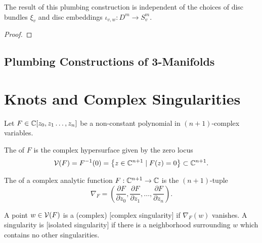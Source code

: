 \begin{theorem}
	The result of this plumbing construction is independent of the choices of disc bundles $\xi_v$ and disc embeddings $\iota_{v,w} : D^m \to S^m_v$.
\end{theorem}

\begin{proof}
\end{proof}

\begin{remark}
\end{remark}

\begin{definition}\label{defn:E8-matrix}
\end{definition}

\subsection{Plumbing Constructions of 3-Manifolds}

\section{Knots and Complex Singularities}

Let $F\in \mathbb{C}[z_0,z_1\ldots, z_n]$ be a non-constant polynomial in $(n+1)$-complex variables.
\begin{definition}
	The  of $F$ is the complex hypersurface given by the zero locus
	\[
		\mathcal{V}(F) = F^{-1}(0)=\left\{ z \in \mathbb{C}^{n+1} \mid F(z)=0\right\} \subset \mathbb{C}^{n+1}.
	\]
\end{definition}


\begin{definition}
	The  of a complex analytic function $F : \mathbb{C}^{n+1} \to \mathbb{C}$ is the $(n+1)$-tuple
	\[
		\nabla_F = \left(\frac{\partial F}{\partial z_0}, \frac{\partial F}{\partial z_1},\ldots, \frac{\partial F}{\partial z_n}\right).
	\]
\end{definition}

\begin{definition}
	A point $w\in \mathcal{V}(F)$ is a (complex) [complex singularity] if $\nabla_F(w)$ vanishes. A singularity is [isolated singularity] if there is a neighborhood surrounding $w$ which contains no other singularities.
\end{definition}

